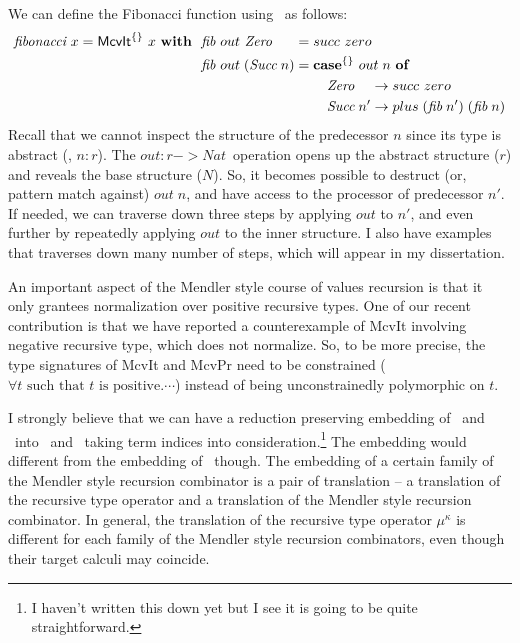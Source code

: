 We can define the Fibonacci function using \McvIt\ as follows:
\begin{align*}
\textit{fibonacci}~x = \textsf{McvIt}^{\{\}}~x~\textbf{with}~~
&  \textit{fib} ~out ~\textit{Zero}~~~~\; = succ~zero \\
&  \textit{fib} ~out \;(\textit{Succ}\;n) =
            \textbf{case}^{\{\}}~out\;n~\textbf{of} \\
&\qquad\qquad\qquad\qquad\quad
              \textit{Zero}~~~\, -> succ~zero \\
&\qquad\qquad\qquad\qquad\quad
              \textit{Succ}\;n'  -> plus\;(\textit{fib}\;n')\;(\textit{fib}\;n)
\end{align*}
Recall that we cannot inspect the structure of the predecessor $n$ since
its type is abstract (\ie, $n:r$). The $out : r -> \textit{Nat}\,$ operation
opens up the abstract structure ($r$) and reveals the base structure ($N$).
So, it becomes possible to destruct (or, pattern match against) $out\;n$,
and have access to the processor of predecessor $n'$. If needed, we can
traverse down three steps by applying $out$ to $n'$, and even further by
repeatedly applying $out$ to the inner structure. I also have examples
that traverses down many number of steps, which will appear in my dissertation.

An important aspect of the Mendler style course of values recursion is that
it only grantees normalization over positive recursive types. One of our
recent contribution is that we have reported a counterexample of \textsf{McvIt}
involving negative recursive type, which does not normalize. So, to be more
precise, the type signatures of \textsf{McvIt} and \textsf{McvPr} need to
be constrained ($\forall t \text{~such that~$t$ is positive}.\cdots$)
instead of being unconstrainedly polymorphic on $t$.

I strongly believe that we can have a reduction preserving embedding of
\McvIt\ and \McvPr\ into \Fixw\, and \Fixi\ taking term indices into
consideration.\footnote{I haven't written this down yet but I see it
is going to be quite straightforward.} The embedding would different from
the embedding of \MPr\ though. The embedding of a certain family of
the Mendler style recursion combinator is a pair of translation --
a translation of the recursive type operator and a translation of
the Mendler style recursion combinator. In general, the translation of
the recursive type operator $\mu^\kappa$ is different for each family
of the Mendler style recursion combinators, even though their target
calculi may coincide.

